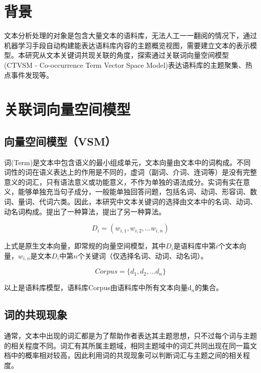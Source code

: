 \section{背景}\label{ux80ccux666f}

文本分析处理的对象是包含大量文本的语料库，无法人工一一翻阅的情况下，通过机器学习手段自动构建能表达语料库内容的主题概览视图，需要建立文本的表示模型。本研究从文本关键词共现关联的角度，探索通过关联词向量空间模型(CTVSM
- Co-occurrence Term Vector Space
Model)表达语料库的主题聚集、热点事件发现等。

\section{关联词向量空间模型}\label{ux5173ux8054ux8bcdux5411ux91cfux7a7aux95f4ux6a21ux578b}

\subsection{向量空间模型（VSM）}\label{ux5411ux91cfux7a7aux95f4ux6a21ux578bvsm}

词(Term)是文本中包含语义的最小组成单元，文本向量由文本中的词构成。不同词性的词在语义表达上的作用是不同的，虚词（副词、介词、连词等）是没有完整意义的词汇，只有语法意义或功能意义，不作为单独的语法成分。实词有实在意义，能够单独充当句子成分，一般能单独回答问题，包括名词、动词、形容词、数词、量词、代词六类。因此，本研究中文本关键词的选择由文本中的名词、动词、动名词构成。\citet{kottwitz2011latex}提出了一种算法，\citet{NI-OVERSAMPLING}提出了另一种算法。

\begin{equation}
D_i = ( w_{i,1}, w_{i,2}, \ldots w_{i,n} )
\end{equation}

上式是原生文本向量，即常规的向量空间模型，其中\(D_i\)是语料库中第\(i\)个文本向量，\(w_{i,n}\)是文本\(D_i\)中第\(n\)个关键词（仅选择名词、动词、动名词）。

\begin{equation}
Corpus = \{ d_1, d_2, \ldots d_n \}
\end{equation}

以上是语料库模型，语料库Corpus由语料库中所有文本向量d\(_n\)的集合。

\subsection{词的共现现象}\label{ux8bcdux7684ux5171ux73b0ux73b0ux8c61}

通常，文本中出现的词汇都是为了帮助作者表达其主题思想，只不过每个词与主题的相关程度不同。词汇有其所属主题域，相同主题域中的词汇共同出现在同一篇文档中的概率相对较高，因此利用词的共现现象可以判断词汇与主题之间的相关程度。

